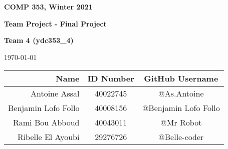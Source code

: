 \documentclass{article}
\date{April 2021}
\begin{document}

              \vspace*{3in}
              \centerline{\bf\Large COMP 353, Winter 2021}
              \centerline{\bf\Large Team Project - Final Project}

              \vspace*{0.5in}
              \centerline{\bf\Large Team 4 (ydc353\_4)}

              \vspace*{0.5in}
              \centerline{\today}

              \vspace*{0.5in}
              \begin{table}[htbp]
                  \begin{center}
                      \begin{tabular}{|r | c| c|}
                          \hline
                          Name & ID Number & GitHub Username \\
                          \hline\
                          Antoine Assal & 40022745 & @As.Antoine  \\
                          \hline
                          Benjamin Lofo Follo & 40008156 & @Benjamin Lofo Follo \\ 
                          \hline
                          Rami Bou Abboud & 40043011 & @Mr Robot \\
                          \hline
                          Ribelle El Ayoubi & 29276726  & @Belle-coder\\
                          \hline
                      \end{tabular}
                  \end{center}
              \end{table}
              \newpage
\tableofcontents
\newpage
\end{document}
